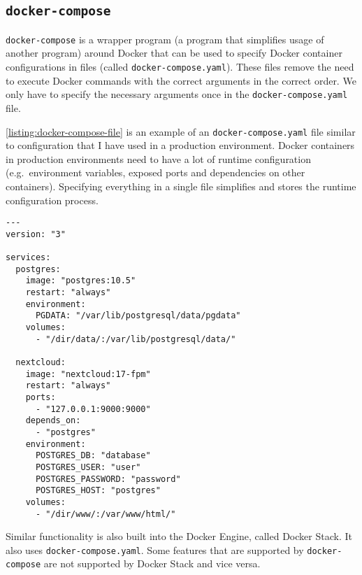 \subsection{\texorpdfstring{\lstinline{docker-compose}}{docker-compose}}
\lstinline{docker-compose} is a wrapper program (a program that simplifies usage of another program) around Docker that can be used to specify Docker container configurations in files (called \lstinline{docker-compose.yaml}). These files remove the need to execute Docker commands with the correct arguments in the correct order. We only have to specify the necessary arguments once in the \lstinline{docker-compose.yaml} file.

\medskip

\autoref{listing:docker-compose-file} is an example of an \lstinline{docker-compose.yaml} file similar to configuration that I have used in a production environment. Docker containers in production environments need to have a lot of runtime configuration (e.g.\ environment variables, exposed ports and dependencies on other containers). Specifying everything in a single file simplifies and stores the runtime configuration process.
\begin{lstlisting}[caption={Example \lstinline{docker-compose.yaml}.},label={listing:docker-compose-file},captionpos=b]
---
version: "3"

services:
  postgres:
    image: "postgres:10.5"
    restart: "always"
    environment:
      PGDATA: "/var/lib/postgresql/data/pgdata"
    volumes:
      - "/dir/data/:/var/lib/postgresql/data/"

  nextcloud:
    image: "nextcloud:17-fpm"
    restart: "always"
    ports:
      - "127.0.0.1:9000:9000"
    depends_on:
      - "postgres"
    environment:
      POSTGRES_DB: "database"
      POSTGRES_USER: "user"
      POSTGRES_PASSWORD: "password"
      POSTGRES_HOST: "postgres"
    volumes:
      - "/dir/www/:/var/www/html/"
\end{lstlisting}

Similar functionality is also built into the Docker Engine, called Docker Stack. It also uses \lstinline{docker-compose.yaml}. Some features that are supported by \lstinline{docker-compose} are not supported by Docker Stack and vice versa.
